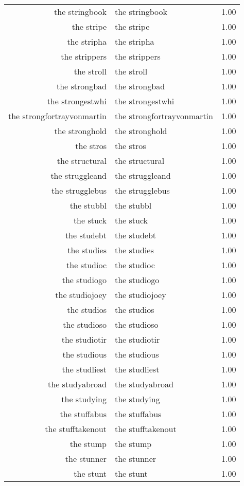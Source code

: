 \begin{table}[ht]
\begin{tabular}{rlr}
  the stringbook & the stringbook & 1.00 \\ 
  the stripe & the stripe & 1.00 \\ 
  the stripha & the stripha & 1.00 \\ 
  the strippers & the strippers & 1.00 \\ 
  the stroll & the stroll & 1.00 \\ 
  the strongbad & the strongbad & 1.00 \\ 
  the strongestwhi & the strongestwhi & 1.00 \\ 
  the strongfortrayvonmartin & the strongfortrayvonmartin & 1.00 \\ 
  the stronghold & the stronghold & 1.00 \\ 
  the stros & the stros & 1.00 \\ 
  the structural & the structural & 1.00 \\ 
  the struggleand & the struggleand & 1.00 \\ 
  the strugglebus & the strugglebus & 1.00 \\ 
  the stubbl & the stubbl & 1.00 \\ 
  the stuck & the stuck & 1.00 \\ 
  the studebt & the studebt & 1.00 \\ 
  the studies & the studies & 1.00 \\ 
  the studioc & the studioc & 1.00 \\ 
  the studiogo & the studiogo & 1.00 \\ 
  the studiojoey & the studiojoey & 1.00 \\ 
  the studios & the studios & 1.00 \\ 
  the studioso & the studioso & 1.00 \\ 
  the studiotir & the studiotir & 1.00 \\ 
  the studious & the studious & 1.00 \\ 
  the studliest & the studliest & 1.00 \\ 
  the studyabroad & the studyabroad & 1.00 \\ 
  the studying & the studying & 1.00 \\ 
  the stuffabus & the stuffabus & 1.00 \\ 
  the stufftakenout & the stufftakenout & 1.00 \\ 
  the stump & the stump & 1.00 \\ 
  the stunner & the stunner & 1.00 \\ 
  the stunt & the stunt & 1.00 \\ 

\end{tabular}
\end{table}
